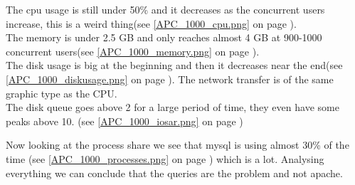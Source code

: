 The \gls{cpu} usage is still under 50\% and it decreases as the concurrent users increase, this is a weird thing(see \autoref{APC_1000_cpu.png} on page \pageref{APC_1000_cpu.png}). 
\\The memory is under 2.5 GB and only reaches almost 4 GB at 900-1000 concurrent users(see \autoref{APC_1000_memory.png} on page \pageref{APC_1000_memory.png}).
\\The disk usage is big at the beginning and then it decreases near the end(see \autoref{APC_1000_diskusage.png} on page \pageref{APC_1000_diskusage.png}).
The network transfer is of the same graphic type as the CPU.
\\The disk queue goes above 2 for a large period of time, they even have some peaks above 10. (see \autoref{APC_1000_iosar.png} on page \pageref{APC_1000_iosar.png})

Now looking at the process share we see that \gls{mysql} is using almost 30\% of the time (see \autoref{APC_1000_processes.png} on page \pageref{APC_1000_processes.png}) which is a lot. Analysing everything we can conclude that the queries are the problem and not \gls{apache}.

\clearpage{}
